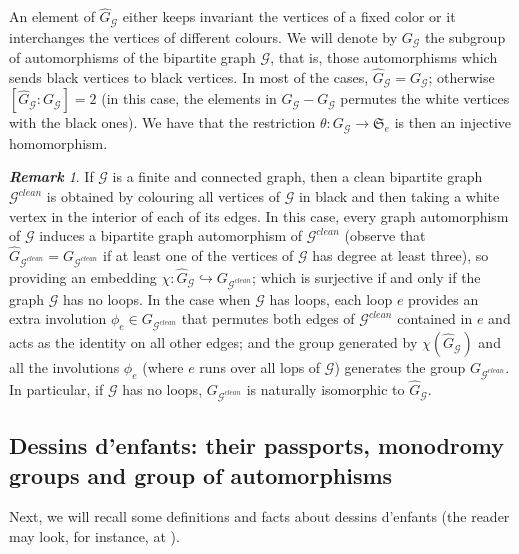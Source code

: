 \documentclass[12pt]{amsart}
\theoremstyle{remark}
\newtheorem{rema}{\bf Remark}
\begin{document}
An element of $\widehat{G}_{\mathcal G}$ either keeps invariant the vertices of a fixed color or it interchanges the vertices of different colours. We will denote by $G_{\mathcal G}$ the subgroup of automorphisms of the bipartite graph ${\mathcal G}$, that is, those automorphisms which sends black vertices to black vertices. In most of the cases, $\widehat{G}_{\mathcal G}=G_{\mathcal G}$; otherwise $[\widehat{G}_{\mathcal G}:G_{\mathcal G}]=2$ (in this case, the elements in $\widehat{G}_{\mathcal G}-G_{\mathcal G}$ permutes the white vertices with the black ones). We have that the restriction $\theta: {G}_{\mathcal G} \to {\mathfrak S}_{e}$ is then an injective homomorphism.

{\vspace{0.3cm}}
\noindent
\begin{rema}
If ${\mathcal G}$ is a finite and connected graph, then a clean bipartite graph ${\mathcal G}^{clean}$ is obtained by colouring all vertices of ${\mathcal G}$ in black and then taking a white vertex in the interior of each of its edges. In this case, every graph automorphism of ${\mathcal G}$ induces a bipartite graph automorphism of ${\mathcal G}^{clean}$  (observe that $\widehat{G}_{{\mathcal G}^{clean}}=G_{{\mathcal G}^{clean}}$ if at least one of the vertices of ${\mathcal G}$ has degree at least three), so providing an embedding $\chi:\widehat{G}_{\mathcal G} \hookrightarrow G_{{\mathcal G}^{clean}}$; which is surjective if and only if the graph ${\mathcal G}$ has no loops. In the case when ${\mathcal G}$ has loops, each loop $e$ provides an extra involution $\phi_{e} \in G_{{\mathcal G}^{clean}}$ that permutes both edges of ${\mathcal G}^{clean}$ contained in $e$ and acts as the identity on all other edges; and the group generated by $\chi(\widehat{G}_{\mathcal G})$ and all the involutions $\phi_{e}$ (where $e$ runs over all lops of ${\mathcal G}$) generates the group $G_{{\mathcal G}^{clean}}$. In particular, if ${\mathcal G}$ has no loops, $G_{{\mathcal G}^{clean}}$ is naturally isomorphic to $\widehat{G}_{\mathcal G}$.

\end{rema}

{\vspace{0.3cm}}

\subsection{Dessins d'enfants: their passports, monodromy groups and group of automorphisms}
Next, we will recall some definitions and facts about dessins d'enfants (the reader may look, for instance, at \cite{GiGo,JS,LZ,Sch,Wolfart1,Wolfart2}). 
\end{document}
